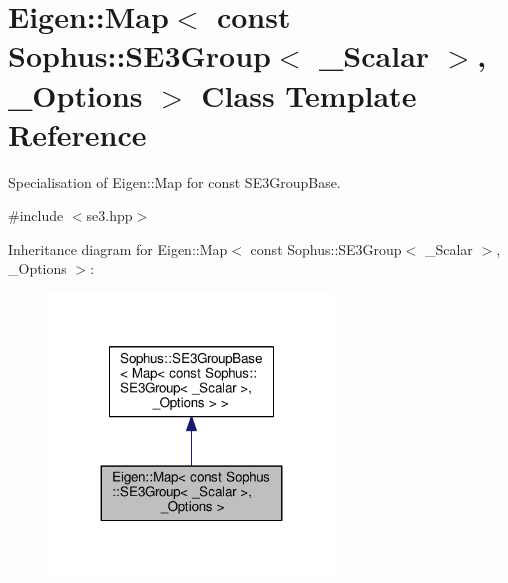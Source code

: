 \hypertarget{class_eigen_1_1_map_3_01const_01_sophus_1_1_s_e3_group_3_01___scalar_01_4_00_01___options_01_4}{}\section{Eigen\+:\+:Map$<$ const Sophus\+:\+:S\+E3\+Group$<$ \+\_\+\+Scalar $>$, \+\_\+\+Options $>$ Class Template Reference}
\label{class_eigen_1_1_map_3_01const_01_sophus_1_1_s_e3_group_3_01___scalar_01_4_00_01___options_01_4}


Specialisation of Eigen\+::\+Map for const S\+E3\+Group\+Base.  




{\ttfamily \#include $<$se3.\+hpp$>$}



Inheritance diagram for Eigen\+:\+:Map$<$ const Sophus\+:\+:S\+E3\+Group$<$ \+\_\+\+Scalar $>$, \+\_\+\+Options $>$\+:
\nopagebreak
\begin{figure}[H]
\begin{center}
\leavevmode
\includegraphics[width=215pt]{class_eigen_1_1_map_3_01const_01_sophus_1_1_s_e3_group_3_01___scalar_01_4_00_01___options_01_4__inherit__graph}
\end{center}
\end{figure}


